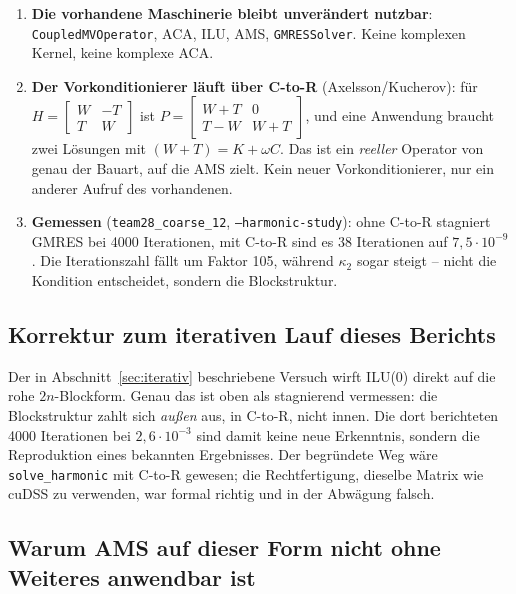 \documentclass[11pt,a4paper]{article}
\begin{document}
\begin{enumerate}[nosep]
\item \textbf{Die vorhandene Maschinerie bleibt unverändert nutzbar}:
  \texttt{CoupledMVOperator}, ACA, ILU, AMS, \texttt{GMRESSolver}. Keine
  komplexen Kernel, keine komplexe ACA.
\item \textbf{Der Vorkonditionierer läuft über C-to-R} (Axelsson/Kucherov):
  für $H = \begin{bmatrix}W & -T\\ T & W\end{bmatrix}$ ist
  $P = \begin{bmatrix}W{+}T & 0\\ T{-}W & W{+}T\end{bmatrix}$, und eine
  Anwendung braucht zwei Lösungen mit $(W{+}T) = K + \omega C$. Das ist ein
  \emph{reeller} Operator von genau der Bauart, auf die AMS zielt. Kein neuer
  Vorkonditionierer, nur ein anderer Aufruf des vorhandenen.
\item \textbf{Gemessen} (\texttt{team28\_coarse\_12}, \texttt{--harmonic-study}):
  ohne C-to-R stagniert GMRES bei 4000 Iterationen, mit C-to-R sind es 38
  Iterationen auf $7{,}5\cdot10^{-9}$. Die Iterationszahl fällt um Faktor 105,
  während $\kappa_2$ sogar steigt -- nicht die Kondition entscheidet, sondern
  die Blockstruktur.
\end{enumerate}

\subsection{Korrektur zum iterativen Lauf dieses Berichts}

Der in Abschnitt~\ref{sec:iterativ} beschriebene Versuch wirft ILU(0) direkt
auf die rohe $2n$-Blockform. Genau das ist oben als stagnierend vermessen: die
Blockstruktur zahlt sich \emph{außen} aus, in C-to-R, nicht innen. Die dort
berichteten 4000 Iterationen bei $2{,}6\cdot10^{-3}$ sind damit keine neue
Erkenntnis, sondern die Reproduktion eines bekannten Ergebnisses. Der
begründete Weg wäre \texttt{solve\_harmonic} mit C-to-R gewesen; die
Rechtfertigung, dieselbe Matrix wie cuDSS zu verwenden, war formal richtig und
in der Abwägung falsch.

\subsection{Warum AMS auf dieser Form nicht ohne Weiteres anwendbar ist}
\end{document}

